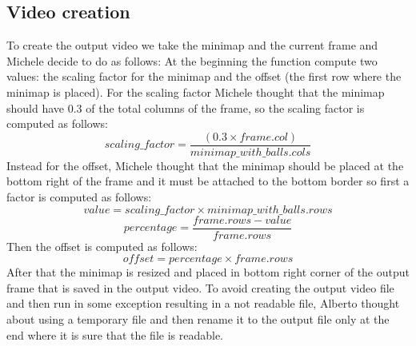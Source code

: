 \subsection{Video creation}
To create the output video we take the minimap and the current frame and Michele decide to do as follows:
At the beginning the function compute two values: the scaling factor for the minimap and the offset
(the first row where the minimap is placed). For the scaling factor Michele thought that
the minimap should have 0.3 of the total columns of the frame, so the scaling factor is computed as follows:
\begin{equation}
	scaling\_factor = \frac{(0.3 \times frame.col)}{minimap\_with\_balls.cols}
\end{equation}
Instead for the offset, Michele thought that the minimap should be placed at the bottom right of the frame
and it must be attached to the bottom border so first a factor is computed as follows:
\begin{equation}
    value = scaling\_factor \times minimap\_with\_balls.rows
\end{equation}
\begin{equation}
    percentage = \frac{frame.rows - value}{frame.rows}
\end{equation}
Then the offset is computed as follows:
\begin{equation}
	offset = percentage \times frame.rows
\end{equation}
After that the minimap is resized and placed in bottom right corner of the output frame that
is saved in the output video.
To avoid creating the output video file and then run in some exception resulting in a not readable file,
Alberto thought about using a temporary file and then rename it to the output file only at the end where
it is sure that the file is readable.
